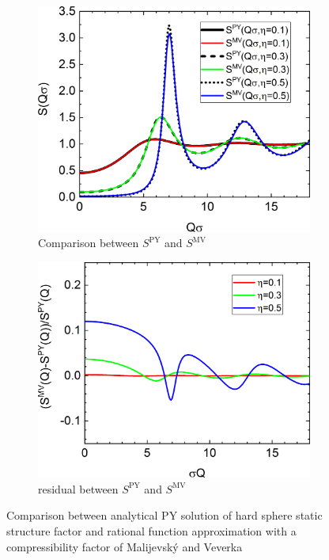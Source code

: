 \begin{figure}[htb]
\begin{subfigure}[b]{.48\textwidth}
   \centering
   \includegraphics[width=1\textwidth]{../images/structure_factor/HardSphere/SQMV.png}
   \caption{Comparison between $S^\mathrm{PY}$ and $S^\mathrm{MV}$}
   \label{fig:SQ:MV_1}
\end{subfigure}
\hfill
\begin{subfigure}[b]{.48\textwidth}
   \centering
   \includegraphics[width=1\textwidth]{../images/structure_factor/HardSphere/ResMV.png}
   \caption{residual between $S^\mathrm{PY}$ and $S^\mathrm{MV}$}
   \label{fig:SQ:MV_2}
\end{subfigure}
\caption{Comparison between analytical PY solution of hard sphere static structure factor and rational function approximation with a compressibility factor of Malijevsk\'{y} and Veverka}
\label{fig:SQ:MV}
\end{figure}

